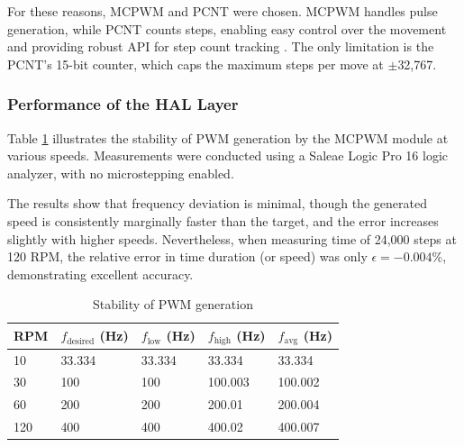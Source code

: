 For these reasons, MCPWM and PCNT were chosen.
MCPWM handles pulse generation, while PCNT counts steps, enabling easy control over the movement and providing robust API for step count tracking \cite{espPCNT}.
The only limitation is the PCNT’s 15-bit counter, which caps the maximum steps per move at $\pm$32,767.


\subsubsection{Performance of the HAL Layer}

Table \ref{tab:performancepwm} illustrates the stability of PWM generation by the MCPWM module at various speeds.
Measurements were conducted using a Saleae Logic Pro 16 logic analyzer, with no microstepping enabled.

The results show that frequency deviation is minimal, though the generated speed is consistently marginally faster than the target, and  the error increases slightly with higher speeds.
Nevertheless, when measuring time of 24,000 steps at 120 RPM, the relative error in time duration (or speed) was only $\epsilon = -0.004\%$, demonstrating excellent accuracy.


\begin{table}[h!]
  \centering
  \caption[Stability of PWM generation]{Stability of PWM generation}
  \begin{tabular}{| m{2cm} || m{2.5cm} | m{2.5cm} | m{2.5cm} | m{2.5cm} |}
    \hline
    RPM & $f_{\mathrm{desired}}$ (Hz) & $f_{\mathrm{low}}$ (Hz) & $f_{\mathrm{high}}$ (Hz) & $f_\mathrm{avg}$ (Hz) \\
    \hline
    10  & 33.334                      & 33.334                  & 33.334                   & 33.334                \\
    30  & 100                         & 100                     & 100.003                  & 100.002               \\
    60  & 200                         & 200                     & 200.01                   & 200.004               \\
    120 & 400                         & 400                     & 400.02                   & 400.007               \\
    \hline
  \end{tabular}
  \label{tab:performancepwm}
\end{table}

